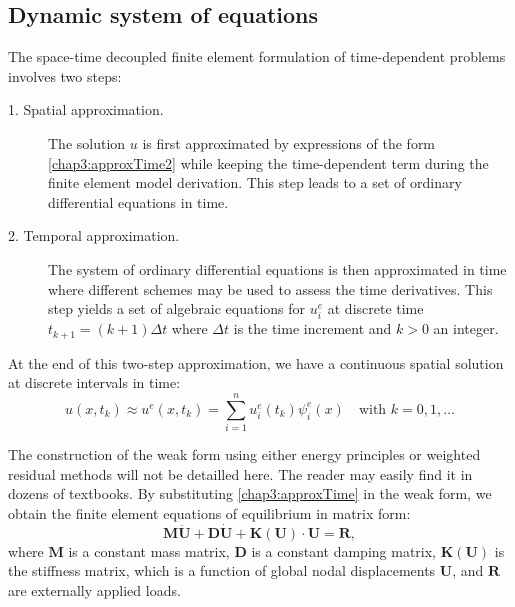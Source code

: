 	\subsection{Dynamic system of equations}	
The space-time decoupled finite element formulation of time-dependent problems involves two steps:
\begin{description}
\item[1. Spatial approximation.]
The solution $ u $ is first approximated by expressions of the form \eqref{chap3:approxTime2} while keeping the time-dependent term during the finite element model derivation. This step leads to a set of ordinary differential equations in time.
\item[2. Temporal approximation.]
The system of ordinary differential equations is then approximated in time where different schemes may be used to assess the time derivatives. This step yields a set of algebraic equations for $ u^e_i $ at discrete time $ t_{k+1} = (k+1) \Delta t$ where $ \Delta t $ is the time increment and $ k > 0$ an integer. 
\end{description}
At the end of this two-step approximation, we have a continuous spatial solution at discrete intervals in time:
\begin{equation}
\label{chap3:approxTime}
u(x, t_k) \approx u^e(x, t_k) = \sum_{i=1}^n u^e_i(t_k) \psi^e_i(x) \quad \text{with } k = 0, 1, \ldots
\end{equation}
	
The construction of the weak form using either energy principles or weighted residual methods will not be detailled here. The reader may easily find it in dozens of textbooks. By substituting \eqref{chap3:approxTime} in the weak form, we obtain the finite element equations of equilibrium in matrix form:
\begin{equation}
\label{chap3:eqDynamic}
\mathbf{M} \mathbf{\ddot U} + \mathbf{D} \mathbf{ \dot U} + \mathbf{K}(\mathbf{U}) \cdot \mathbf{U} = \mathbf{R},
\end{equation}
where $ \mathbf{M} $ is a constant mass matrix, $\mathbf{D}$ is a constant damping matrix, $ \mathbf{K}(\mathbf{U}) $ is the stiffness matrix, which is a function of global nodal displacements $\mathbf{U}$, and $\mathbf{R}$ are externally applied loads. 

